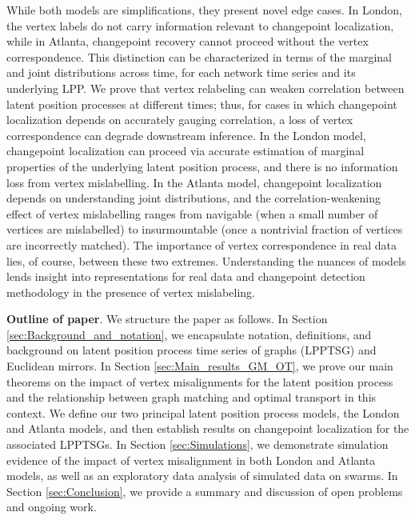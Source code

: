 \documentclass[12pt]{article}
\theoremstyle{definition}
\begin{document}
While both models are simplifications, they present novel edge cases. 
In London, the vertex labels do not carry information relevant to changepoint localization, while in Atlanta, changepoint recovery cannot proceed without the vertex correspondence. This distinction can be characterized in terms of the marginal and joint distributions across time, for each network time series and its underlying LPP. We prove that vertex relabeling can weaken correlation between latent position processes at different times; thus, for cases in which changepoint localization depends on accurately gauging correlation, a loss of vertex correspondence can degrade downstream inference. In the London model, changepoint localization can proceed via accurate estimation of marginal properties of the underlying latent position process, and there is no information loss from vertex mislabelling. In the Atlanta model, changepoint localization depends on understanding joint distributions, and the correlation-weakening effect of vertex mislabelling ranges from navigable (when a small number of vertices are mislabelled) to insurmountable (once a nontrivial fraction of vertices are incorrectly matched).
The importance of vertex correspondence in real data lies, of course, between these two extremes. Understanding the nuances of models lends insight into representations for real data and changepoint detection methodology in the presence of vertex mislabeling.



 
{\bf Outline of paper}. We structure the paper as follows. In Section \ref{sec:Background_and_notation}, we encapsulate notation, definitions, and background on latent position process time series of graphs (LPPTSG) and Euclidean mirrors. In Section \ref{sec:Main_results_GM_OT}, we prove our main theorems on the impact of vertex misalignments for the latent position process and the relationship between graph matching and optimal transport in this context.  We define our two principal latent position process models, the London and Atlanta models, and then establish results on changepoint localization for the associated LPPTSGs. In Section \ref{sec:Simulations}, we demonstrate simulation evidence of the impact of vertex misalignment in both London and Atlanta models, as well as an exploratory data analysis of simulated data on swarms. In Section \ref{sec:Conclusion}, we provide a summary and discussion of open problems and ongoing work.  
\end{document}
